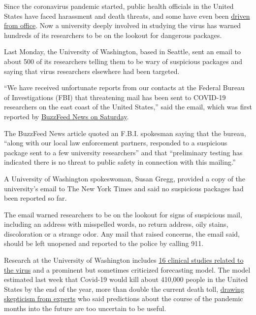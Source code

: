 Since the coronavirus pandemic started, public health officials in the
United States have faced harassment and death threats, and some have
even been
\href{https://www.nytimes3xbfgragh.onion/2020/06/22/us/coronavirus-health-officials.html}{driven
from office}. Now a university deeply involved in studying the virus has
warned hundreds of its researchers to be on the lookout for dangerous
packages.

Last Monday, the University of Washington, based in Seattle, sent an
email to about 500 of its researchers telling them to be wary of
suspicious packages and saying that virus researchers elsewhere had been
targeted.

``We have received unfortunate reports from our contacts at the Federal
Bureau of Investigations (FBI) that threatening mail has been sent to
COVID-19 researchers on the east coast of the United States,'' said the
email, which was first reported by
\href{https://www.buzzfeednews.com/article/kenbensinger/suspicious-package-covid-19-researchers-fbi}{BuzzFeed
News on Saturday}.

The BuzzFeed News article quoted an F.B.I. spokesman saying that the
bureau, ``along with our local law enforcement partners, responded to a
suspicious package sent to a few university researchers'' and that
``preliminary testing has indicated there is no threat to public safety
in connection with this mailing.''

A University of Washington spokeswoman, Susan Gregg, provided a copy of
the university's email to The New York Times and said no suspicious
packages had been reported so far.

The email warned researchers to be on the lookout for signs of
suspicious mail, including an address with misspelled words, no return
address, oily stains, discoloration or a strange odor. Any mail that
raised concerns, the email said, should be left unopened and reported to
the police by calling 911.

Research at the University of Washington includes
\href{https://www.iths.org/iths-covid-19-research-resources/current-covid-19-research/}{16
clinical studies related to the virus} and a prominent but sometimes
criticized forecasting model. The model estimated last week that
Covid-19 would kill about 410,000 people in the United States by the end
of the year, more than double the current death toll,
\href{https://twitter.com/CT_Bergstrom/status/1301738951078629376}{drawing
skepticism from experts} who said predictions about the course of the
pandemic months into the future are too uncertain to be useful.

